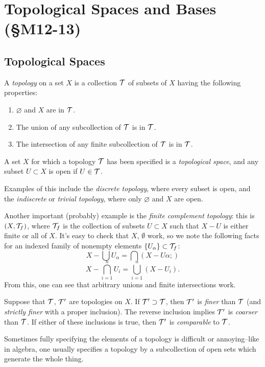 \documentclass[10pt]{report}
\begin{document}
\section{Topological Spaces and Bases (\S M12-13)}
\subsection{Topological Spaces}
\begin{definition}
  A \emph{topology} on a set $X$ is a collection $\mathcal{T}$ of subsets of $X$ having the following properties:
  \begin{enumerate}[label={(\arabic*)}]
    \item $\varnothing$ and $X$ are in $\mathcal{T}$.
    \item The union of any subcollection of $\mathcal{T}$ is in $\mathcal{T}$.
    \item The intersection of any finite subcollection of $\mathcal{T}$ is in $\mathcal{T}$.
  \end{enumerate}
  A set $X$ for which a topology $\mathcal{T}$ has been specified is a \emph{topological space}, and any subset $U \subset X$ is open if $U \in \mathcal{T}$.
\end{definition}

  Examples of this include the \emph{discrete topology}, where every subset is open, and the \emph{indiscrete} or \emph{trivial topology}, where only $\varnothing$ and $X$ are open.
  
  Another important (probably) example is the \emph{finite complement topology}:
  this is $(X,\mathcal{T}_f)$, where $\mathcal{T}_f$ is the collection of subsets $U \subset X$ such that $X - U$ is either finite or all of $X$.
  It's easy to check that $X$, $\emptyset$ work, so we note the following facts for an indexed family of nonempty elements $\{U_\alpha\} \subset \mathcal{T}_f$:
  \[ X - \bigcup U_\alpha = \bigcap (X - U\alpha;) \]
  \[ X - \bigcap_{i=1}^n U_i = \bigcup_{i = 1}^n (X - U_i). \]
  From this, one can see that arbitrary unions and finite intersections work. 

\begin{definition}
  Suppose that $\mathcal{T}$, $\mathcal{T}'$ are topologies on $X$.
  If $\mathcal{T}' \supset \mathcal{T}$, then $\mathcal{T}'$ is \emph{finer} than $\mathcal{T}$ (and \emph{strictly finer} with a proper inclusion).
  The reverse inclusion implies $\mathcal{T}'$ is \emph{coarser} than $\mathcal{T}$.
  If either of these inclusions is true, then $\mathcal{T}'$ is \emph{comparable} to $\mathcal{T}$.
\end{definition}

Sometimes fully specifying the elements of a topology is difficult or annoying--like in algebra, one usually specifies a topology by a subcollection of open sets which generate the whole thing.
\end{document}

